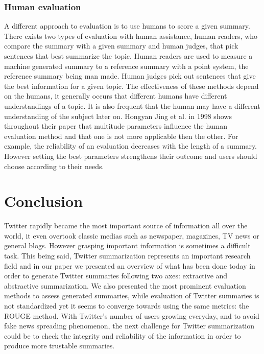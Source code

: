 \documentclass[runningheads]{llncs}
\begin{document}
\subsubsection{Human evaluation}

A different approach to evaluation is to use humans to score a given summary.
There exists two types of evaluation with human assistance, human readers, who
compare the summary with a given summary and human judges, that pick sentences
that best summarize the topic.  Human readers are used to measure a machine
generated summary to a reference summary with a point system, the reference
summary being man made. Human judges pick out sentences that give the best
information for a given topic. The effectiveness of these methods depend on the
humans, it generally occurs that different humans have different understandings
of a topic. It is also frequent that the human may have a different
understanding of the subject later on. Hongyan Jing et al. in 1998
\cite{jing_summarization_nodate} shows throughout their paper that multitude
parameters influence the human evaluation method and that one is not more
applicable then the other. For example, the reliability of an evaluation
decreases with the length of a summary. However setting the best parameters
strengthens their outcome and users should choose according to their needs.

\section{Conclusion}

Twitter rapidly became the most important source of information all over the
world, it even overtook classic medias such as newspaper, magazines, TV news or
general blogs. However grasping important information is sometimes a difficult
task. This being said, Twitter summarization represents an important research
field and in our paper we presented an overview of what has been done today in
order to generate Twitter summaries following two axes: extractive and
abstractive summarization. We also presented the most prominent evaluation
methods to assess generated summaries, while evaluation of Twitter summaries is
not standardized yet it seems to converge towards using the same metrics: the
ROUGE method. With Twitter's number of users growing everyday, and to avoid fake
news spreading phenomenon, the next challenge for Twitter summarization could
be to check the integrity and reliability of the information in order to
produce more trustable summaries.

\printbibliography
\end{document}
